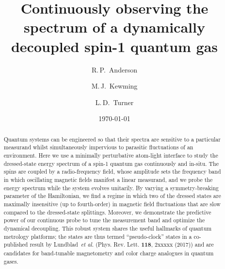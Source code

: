 \documentclass[aps,prl,reprint,superscriptaddress,floatfix]{revtex4-1}
\begin{document}
\title{Continuously observing the spectrum of a dynamically decoupled spin-1 quantum gas}

\author{R.\,P.~Anderson}
\author{M.\,J.~Kewming }
\author{L.\,D.~Turner}

\date{\today}

\begin{abstract}
Quantum systems can be engineered so that their spectra are sensitive to a particular measurand whilst simultaneously impervious to parasitic fluctuations of an environment.
Here we use a minimally perturbative atom-light interface to study the dressed-state energy spectrum of a spin-1 quantum gas continuously and in-situ.
The spins are coupled by a radio-frequency field, whose amplitude sets the frequency band in which oscillating magnetic fields manifest a linear measurand, and we probe the energy spectrum while the system evolves unitarily.
By varying a symmetry-breaking parameter of the Hamiltonian, we find a regime in which two of the dressed states are maximally insensitive (up to fourth-order) in magnetic field fluctuations that are slow compared to the dressed-state splittings.
Moreover, we demonstrate the predictive power of our continuous probe to tune the measurement band and optimize the dynamical decoupling.
This robust system shares the useful hallmarks of quantum metrology platforms; the states are thus termed ``pseudo-clock'' states in a co-published result by Lundblad~\emph{et al.} (Phys. Rev. Lett. \textbf{118}, 2xxxxx (2017)) and are candidates for band-tunable magnetometry and color charge analogues in quantum gases. 
\end{abstract}

\maketitle
\end{document}
